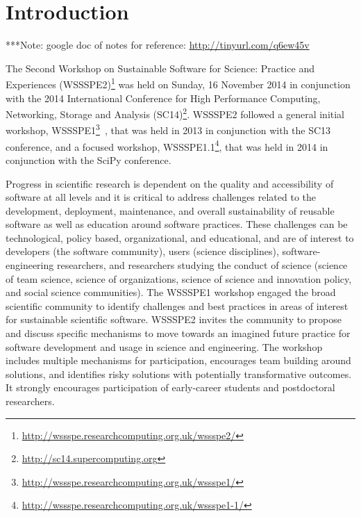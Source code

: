 \documentclass[11pt, oneside]{amsart}
\newcommand{\note}[1]{ {\textcolor{blueish}    { ***Note:      #1 }}}
\newcommand{\katznote}[1]{ {\textcolor{magenta}    { ***Dan:      #1 }}}
\newcommand{\gabnote}[1]{ {\textcolor{cyan}    { ***Gabrielle:     #1 }}}
\newcommand{\nchnote}[1]{  {\textcolor{orange}      { ***Neil: #1 }}}
\newcommand{\manishnote}[1]{  {\textcolor{violet}     { ***Manish: #1 }}}
\newcommand{\davidnote}[1]{  {\textcolor{darkgreen}      { ***David: #1 }}}
\begin{document}
\section{Introduction}

%
%
%
%


\note{google doc of notes for reference: \url{http://tinyurl.com/q6ew45v}}

The Second Workshop on Sustainable Software for Science: Practice and
Experiences
(WSSSPE2)\footnote{\url{http://wssspe.researchcomputing.org.uk/wssspe2/}} was
held on Sunday, 16 November 2014 in conjunction with the 2014 International
Conference for High Performance Computing, Networking, Storage and Analysis
(SC14)\footnote{\url{http://sc14.supercomputing.org}}.
WSSSPE2 followed a general initial workshop,
WSSSPE1\footnote{\url{http://wssspe.researchcomputing.org.uk/wssspe1/}}~\cite{WSSSPE1-pre-report,WSSSPE1},
that was held in 2013 in conjunction with the SC13 conference, and a focused
workshop,
WSSSPE1.1\footnote{\url{http://wssspe.researchcomputing.org.uk/wssspe1-1/}},
that was held in 2014 in conjunction with the SciPy conference.

Progress in scientific research is dependent on the quality and accessibility of
software at all levels and it is critical to address challenges related to the
development, deployment, maintenance, and overall sustainability of reusable
software as well as education around software practices. These challenges can be
technological, policy based, organizational, and educational, and are of
interest to developers (the software community), users (science disciplines),
software-engineering researchers, and researchers studying the conduct of
science (science of team science, science of organizations, science of science
and innovation policy, and social science communities). The WSSSPE1 workshop
engaged the broad scientific community to identify challenges and best practices
in areas of interest for sustainable scientific software. WSSSPE2 invites the
community to propose and discuss specific mechanisms to move towards an imagined
future practice for software development and usage in science and engineering.
The workshop includes multiple mechanisms for participation, encourages team
building around solutions, and identifies risky solutions with potentially
transformative outcomes. It strongly encourages participation of early-career
students and postdoctoral researchers.
\end{document}

